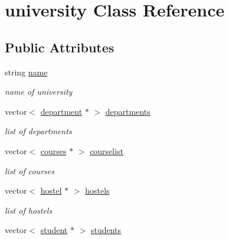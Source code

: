 \hypertarget{classuniversity}{\section{university \-Class \-Reference}
\label{classuniversity}
}
\subsection*{\-Public \-Attributes}
\begin{DoxyCompactItemize}
\item 
\hypertarget{classuniversity_a6752aefe5e6f6f53670d182ec8a88313}{string \hyperlink{classuniversity_a6752aefe5e6f6f53670d182ec8a88313}{name}}\label{classuniversity_a6752aefe5e6f6f53670d182ec8a88313}

\begin{DoxyCompactList}\small\item\em name of university \end{DoxyCompactList}\item 
\hypertarget{classuniversity_a63d701072d80371f762954d9a490d36c}{vector$<$ \hyperlink{classdepartment}{department} $\ast$ $>$ \hyperlink{classuniversity_a63d701072d80371f762954d9a490d36c}{departments}}\label{classuniversity_a63d701072d80371f762954d9a490d36c}

\begin{DoxyCompactList}\small\item\em list of departments \end{DoxyCompactList}\item 
\hypertarget{classuniversity_a2bd163c64bae98e04e92a1d73b249987}{vector$<$ \hyperlink{classcourses}{courses} $\ast$ $>$ \hyperlink{classuniversity_a2bd163c64bae98e04e92a1d73b249987}{courselist}}\label{classuniversity_a2bd163c64bae98e04e92a1d73b249987}

\begin{DoxyCompactList}\small\item\em list of courses \end{DoxyCompactList}\item 
\hypertarget{classuniversity_a14c6cec6c1a22d2c69d4bd95d96a6582}{vector$<$ \hyperlink{classhostel}{hostel} $\ast$ $>$ \hyperlink{classuniversity_a14c6cec6c1a22d2c69d4bd95d96a6582}{hostels}}\label{classuniversity_a14c6cec6c1a22d2c69d4bd95d96a6582}

\begin{DoxyCompactList}\small\item\em list of hostels \end{DoxyCompactList}\item 
\hypertarget{classuniversity_a8fd2bba451c06658afc2b0ad65e439f4}{vector$<$ \hyperlink{classstudent}{student} $\ast$ $>$ \hyperlink{classuniversity_a8fd2bba451c06658afc2b0ad65e439f4}{students}}\label{classuniversity_a8fd2bba451c06658afc2b0ad65e439f4}


\end{DoxyCompactItemize}
